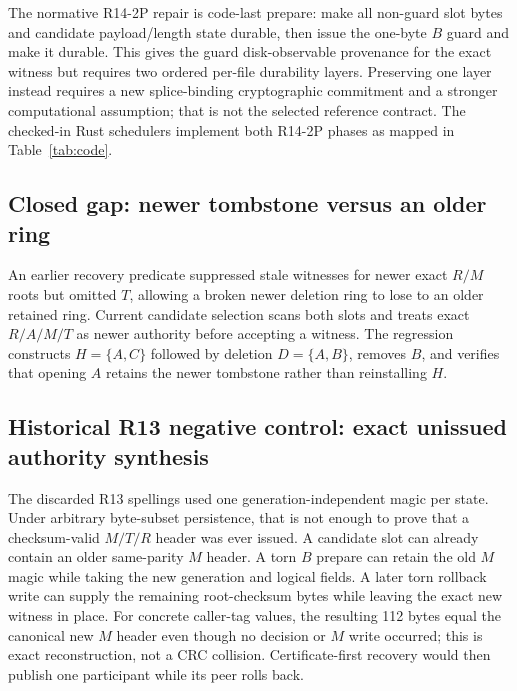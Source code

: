\documentclass[10pt,twocolumn]{article}
\theoremstyle{remark}
\begin{document}
The normative R14-2P repair is code-last prepare: make all non-guard slot bytes and candidate
payload/length state durable, then issue the one-byte $B$ guard and make it durable. This gives the
guard disk-observable provenance for the exact witness but requires two ordered per-file durability
layers. Preserving one layer instead requires a new splice-binding cryptographic commitment and a
stronger computational assumption; that is not the selected reference contract. The checked-in
Rust schedulers implement both R14-2P phases as mapped in Table~\ref{tab:code}.

\subsection{Closed gap: newer tombstone versus an older ring}

An earlier recovery predicate suppressed stale witnesses for newer exact $R/M$ roots but omitted
$T$, allowing a broken newer deletion ring to lose to an older retained ring. Current candidate
selection scans both slots and treats exact $R/A/M/T$ as newer authority before accepting a
witness. The regression  constructs
$H=\{A,C\}$ followed by deletion $D=\{A,B\}$, removes $B$, and verifies that opening $A$ retains
the newer tombstone rather than reinstalling $H$.

\subsection{Historical R13 negative control: exact unissued authority synthesis}

The discarded R13 spellings used one generation-independent magic per state. Under arbitrary
byte-subset persistence, that is not enough to prove that a checksum-valid $M/T/R$ header was ever
issued. A candidate slot can already contain an older same-parity $M$ header. A torn $B$ prepare
can retain the old $M$ magic while taking the new generation and logical fields. A later torn
rollback write can supply the remaining root-checksum bytes while leaving the exact new witness in
place. For concrete caller-tag values, the resulting 112 bytes equal the canonical new $M$ header
even though no decision or $M$ write occurred; this is exact reconstruction, not a CRC collision.
Certificate-first recovery would then publish one participant while its peer rolls back.
\end{document}
